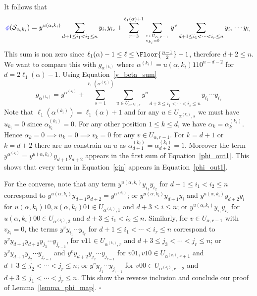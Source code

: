 \documentclass[12pt,reqno]{amsart}
\newcommand{\blue}[1]{\textcolor{blue}{#1}}
\theoremstyle{plain}
\theoremstyle{definition}
\DeclarePairedDelimiter\Floor\lfloor\rfloor
\begin{document}
It follows that
\begin{equation}  \label{phi_out1}
    \blue{\phi}(\mathcal{S}_{\alpha, k_i}) =   y^{u(\alpha, k_i)} \sum_{d+1 \leq i_1 < i_2 \leq n}y_{i_1} y_{i_2} +  \sum_{r=3}^{\ell_1(\alpha)+1} \sum_{v \in U_{\alpha,r-1}\atop v_{k_i}=0\hfill} y^v \sum_{d+1 \leq i_1 < \cdots < i_{r} \leq n}y_{i_1} \cdots  y_{i_{r}}  
\end{equation}
This sum is non zero since $\ell_1(\alpha)-1\le\ell \le \Floor{\frac{n-1}{2}}-1$, therefore $d+2\le n$.
We want to compare this with $g_{\alpha^{(k_i)}}$ where $\alpha^{(k_i)}=u(\alpha, k_i)110^{n-d-2}$ for $d=2\ell_1(\alpha)-1$.
Using Equation~\eqref{y_beta_sum}
\begin{equation} \label{gin}
	g_{\alpha^{(k_i)}} = y^{{\alpha^{(k_i)}}}+  \sum_{s=1}^{\ell_1(\alpha^{(k_i)})} \sum_{u \in U_{\alpha^{(k_i)},s}} y^u
										\sum_{d+3 \leq i_1 < \cdots < i_s \leq n} y_{i_1} \cdots y_{i_{s}} 
\end{equation}
Note that $\ell_1(\alpha^{(k_i)})=\ell_1(\alpha)+1$ and for any $u \in U_{\alpha^{(k_i)},s}$ we must have $u_{k_i}=0$ since $\alpha^{(k_i)}_{k_i}=0$. For any other position $1\le k\le d$, we have $\alpha_k=\alpha_k^{(k_i)}$. Hence $\alpha_k=0 \implies u_k=0 \implies v_k=0$ for any  $v\in U_{\alpha,r-1}$. For $k=d+1$ or $k=d+2$ there are no constrain on $u$ as $\alpha_{d+1}^{(k_i)}=\alpha_{d+2}^{(k_i)}=1$. Moreover the term $ y^{{\alpha^{(k_i)}}}=y^{u(\alpha, k_i)}y_{d+1}y_{d+2}$ appears in the first sum of Equation~\eqref{phi_out1}.
This shows that every term in Equation~\eqref{gin} appears in Equation~\eqref{phi_out1}.

For the converse, note that any term $y^{u(\alpha, k_i)} y_{i_1} y_{i_2}$  for $d+1 \leq i_1 < i_2 \leq  n$ correspond to 
$y^{u(\alpha, k_i)} y_{d+1} y_{d+2}=y^{\alpha^{(k_1)}}$;
or $y^{u(\alpha, k_i)}y_{d+1}y_{i}$ and $y^{u(\alpha, k_i)}y_{d+2}y_{i}$ for $u(\alpha, k_i)10, u(\alpha, k_i)01\in U_{\alpha^{(k_i)},1}$ and
$d+3\le i\le n$;
or $y^{u(\alpha, k_i)}y_{i_1}y_{i_2}$ for $u(\alpha, k_i)00\in U_{\alpha^{(k_i)},2}$ and $d+3\le i_1<i_2\le n$.
Similarly, for $v\in U_{\alpha,r-1}$ with $v_{k_i}=0$, the terms $y^v y_{i_1} \cdots  y_{i_{r}} $ for $d+1 \leq i_1 < \cdots < i_{r} \leq n$ correspond to  
$y^vy_{d+1} y_{d+2} y_{j_{3}}\cdots  y_{j_{r-1}} $, for $v11\in U_{\alpha^{(k_i)},r}$ and $d+3 \leq j_3 < \cdots <j_{r} \leq n$; 
or 
$y^vy_{d+1} y_{j_{2}}\cdots  y_{j_{r-1}} $ and $y^vy_{d+2} y_{j_{2}}\cdots  y_{j_{r-1}} $ for $v01,v10 \in U_{\alpha^{(k_i)},r+1}$ and $d+3 \leq j_2< \cdots <j_{r} \leq n$;
or
$y^v y_{j_{1}}\cdots  y_{j_{r-1}} $ for $v00 \in U_{\alpha^{(k_i)},r+2}$ and $d+3 \leq j_1< \cdots <j_{r} \leq n$.
This show the reverse inclusion and conclude our proof of 
 Lemma~\ref{lemma_phi_map}. \hfill$\square$
\end{document}
